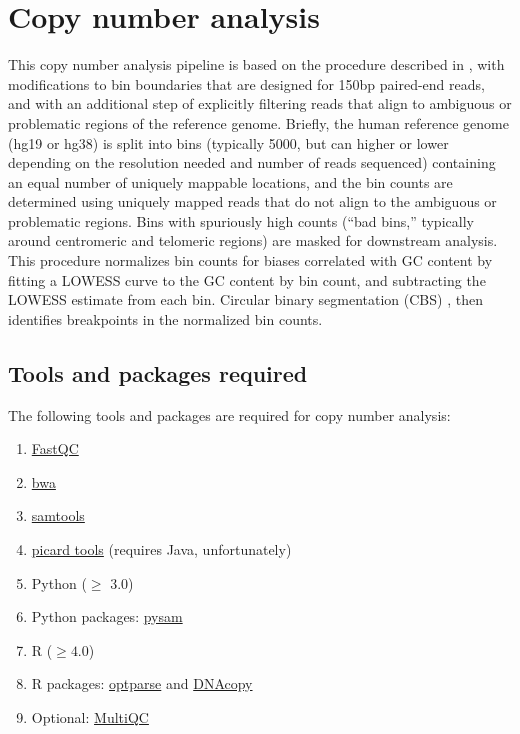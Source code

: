 \documentclass[11pt]{article}
\begin{document}
\section{Copy number analysis}
This copy number analysis pipeline is based on the procedure described in
\citep{baslan2012genome,kendall2014computational}, with modifications to
bin boundaries that are designed for 150bp paired-end reads, and with
an additional step of explicitly filtering reads that align to ambiguous
or problematic regions of the reference genome. Briefly, the human
reference genome (hg19 or hg38) is split into bins (typically 5000, but
can higher or lower depending on the resolution needed and number of
reads sequenced) containing an equal number of uniquely mappable
locations, and the bin counts are determined using uniquely mapped reads
that do not align to the ambiguous or problematic regions. Bins with
spuriously high counts (``bad bins,'' typically around centromeric and
telomeric regions) are masked for downstream analysis. This procedure
normalizes bin counts for biases correlated with GC content by fitting a
LOWESS curve to the GC content by bin count, and subtracting the LOWESS
estimate from each bin.  Circular binary segmentation (CBS)
\citep{olshen2004circular}, then identifies breakpoints in the
normalized bin counts.


\subsection{Tools and packages required}
The following tools and packages are required for copy number analysis:
\begin{enumerate}
\setlength{\itemsep}{0pt}
  \item \href{https://www.bioinformatics.babraham.ac.uk/projects/fastqc/}
    {FastQC}
  \item \href{https://github.com/lh3/bwa}{bwa}
  \item \href{http://www.htslib.org/}{samtools}
  \item \href{https://broadinstitute.github.io/picard/}{picard tools}
    (requires Java, unfortunately)
  \item Python ($\geq$ 3.0)
  \item Python packages:
    \href{https://pysam.readthedocs.io/en/latest/}{pysam}
  \item R ($\geq 4.0$)
  \item R packages:
    \href{https://cran.r-project.org/web/packages/optparse/index.html}{optparse}
    and \href{https://bioconductor.org/packages/release/bioc/html/DNAcopy.html}
    {DNAcopy}
  \item Optional: \href{https://multiqc.info/}{MultiQC}
\end{enumerate}
\end{document}
